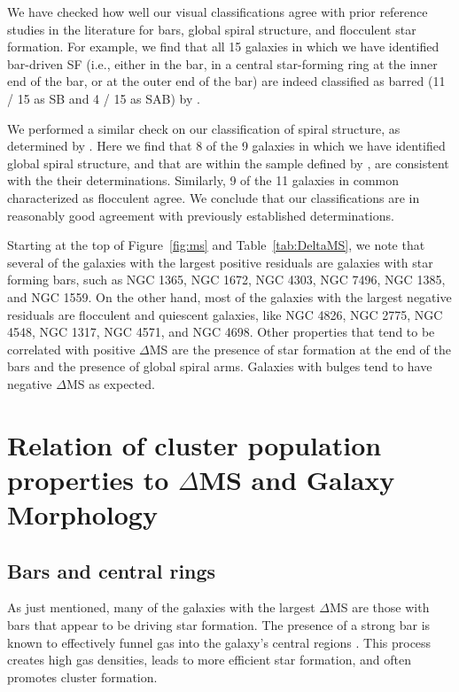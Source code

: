 \documentclass[]{aastex631}
\begin{document}
We have checked how well our visual classifications agree with prior reference studies in the literature for bars, global spiral structure, and flocculent star formation. For example, we find that all 15 galaxies in which we have identified bar-driven SF (i.e., either in the bar, in a central star-forming ring at the inner end of the bar, or at the outer end of the bar) are indeed classified as barred (11 / 15 as SB and 4 / 15 as SAB) by \citet{buta15}. 

We performed a similar check on our classification of spiral structure, as determined by \citet{EE87}. Here we find that 8 of the 9 galaxies in which we have identified global spiral structure, and that are within the sample defined by \citet{EE87}, are consistent with the their determinations. Similarly, 9 of the 11 galaxies in common characterized as flocculent agree. We conclude that our classifications are in reasonably good agreement with previously established determinations.

Starting at the top of Figure~\ref{fig:ms} and Table~\ref{tab:DeltaMS}, we note that several of the galaxies with the largest positive residuals are galaxies with star forming bars, such as NGC 1365, NGC 1672, NGC 4303, NGC 7496, NGC 1385, and NGC 1559. On the other hand, most of the galaxies with the largest negative residuals are flocculent and quiescent galaxies, like NGC 4826, NGC 2775, NGC 4548, NGC 1317, NGC 4571, and NGC 4698. Other properties that tend to be correlated with positive $\Delta$MS are the presence of star formation at the end of the bars and the presence of global spiral arms. Galaxies with bulges tend to have negative $\Delta$MS as expected.

\section{Relation of cluster population properties to $\Delta$MS and Galaxy Morphology} \label{sect:deltams}

\subsection{Bars and central rings}

As just mentioned, many of the galaxies with the largest $\Delta$MS are those with bars that appear to be driving star formation.  
The presence of a strong bar is known to effectively funnel gas into the galaxy's central regions \citep[e.g.][]{athanassoula_existence_1992,sellwood_dynamics_1993,kuno_nobeyama_2007, sormani_fuelling_2023, schinnerer_phangs-jwst_2023}.  This process creates high gas densities, leads to more efficient star formation, and often promotes cluster formation. 
\end{document}
